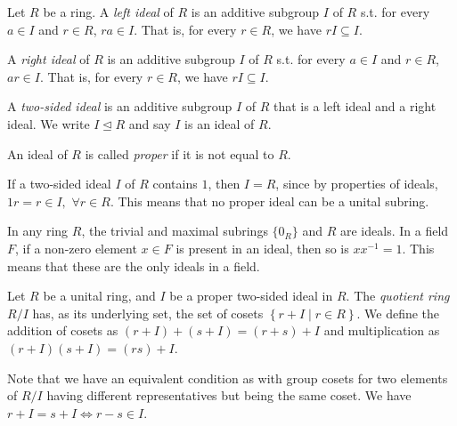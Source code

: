 \begin{definition}
  Let $R$ be a ring. A \emph{left ideal} of $R$ is an additive subgroup $I$ of $R$ s.t.
  for every $a\in I$ and $r\in R$, $ra\in I$. That is, for every $r\in R$, we have
  $rI\subseteq I$.

  A \emph{right ideal} of $R$ is an additive subgroup $I$ of $R$ s.t. for every $a\in I$
  and $r\in R$, $ar\in I$. That is, for every $r\in R$, we have $rI\subseteq I$.

  A \emph{two-sided ideal} is an additive subgroup $I$ of $R$ that is a left ideal and a
  right ideal. We write $I\trianglelefteq R$ and say $I$ is an ideal of $R$.

  An ideal of $R$ is called \emph{proper} if it is not equal to $R$. 
  \label{<+label+>}
\end{definition}

\begin{remark}
If a two-sided ideal $I$ of $R$ contains $1$, then $I = R$, since by properties of ideals, $1r = r \in I,$  $\forall r \in R.$
This means that no proper ideal can be a unital subring.
\end{remark}

\begin{remark}
    In any ring $R$, the trivial and maximal subrings $\{0_R\}$ and $R$ are ideals. In a field $F$, if a non-zero element $x \in F$ is present in an ideal, then so is $xx^{-1} = 1.$ This means that these are the only ideals in a field. 
\end{remark}

\begin{definition}
  Let $R$ be a unital ring, and $I$ be a proper two-sided ideal in $R$. The
  \emph{quotient ring} $R/I$ has, as its underlying set, the set of cosets $\left\{ r+I \mid r\in R
  \right\}$. We define the addition of cosets as $(r+I)+(s+I)=(r+s)+I$ and multiplication
  as $(r+I)(s+I)=(rs)+I$. 
  \label{<+label+>}
\end{definition}

Note that we have an equivalent condition as with group cosets for two elements of $R/I$ having different representatives but being the same coset. We have $r + I = s + I \iff r - s \in I$.

